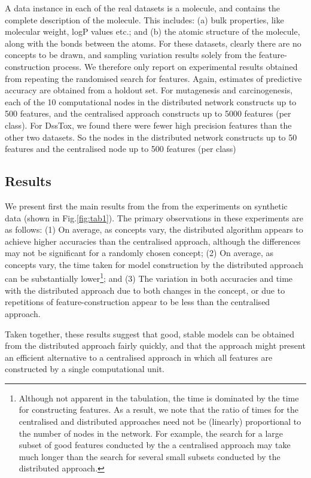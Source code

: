 A data instance in each of the real datasets is a molecule, and contains the
complete description of the molecule. This includes: (a) bulk properties, like
molecular weight, logP values etc.; and (b) the atomic structure of the molecule, along
with the bonds between the atoms. For these datasets, clearly
there are no concepts to be drawn, and sampling variation results
solely from the feature-construction process. We therefore only report
on experimental results obtained from repeating the randomised search for
features. Again, estimates of predictive accuracy are obtained from a holdout set.
For mutagenesis and carcinogenesis, each of the 10 computational nodes in the distributed
network constructs up to  500 features, and the centralised approach constructs up to 5000 features (per class). For
DssTox, we found there were fewer high precision features than the other two datasets.
So the nodes in the distributed network constructs up to 50 features and the centralised node up to 
500 features (per class)

\subsection{Results}
\label{sec:results}

We present first the main results from the from the experiments on synthetic data (shown in Fig.\ref{fig:tab1}).
The primary observations in these experiments are as follows:
(1) On average, as concepts vary, the distributed algorithm appears to achieve higher accuracies
    than the centralised approach, although the differences may not be significant for a randomly
    chosen concept;
(2) On average, as concepts vary, the time taken for model construction by the distributed approach
    can be substantially lower\footnote{Although not apparent in the tabulation, the time is dominated
    by the time for constructing features. As a result, we note that the ratio of times for the
    centralised and distributed approaches need not be (linearly) proportional to the number of nodes
    in the network. For example, the search for a large subset of good features conducted by the
    a centralised approach may take much longer than the search for several small subsets conducted
    by the distributed approach.}; and
(3) The variation in both accuracies and time with the distributed approach due to both changes
    in the concept, or due to repetitions of feature-construction appear to be less than
    the centralised approach.
    

Taken together, these results suggest that good, stable models can be obtained from the distributed
approach fairly quickly, and that the approach might present an efficient alternative to
a centralised approach in which all features are constructed by a single computational unit.

